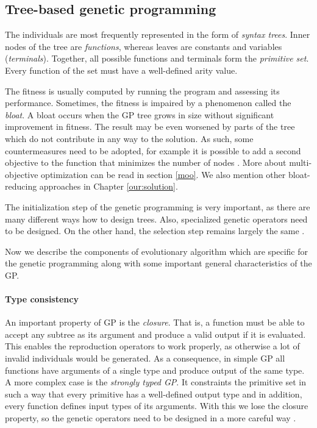 \subsection{Tree-based genetic programming} \label{gp:treebased}
The individuals are most frequently represented in the form of 
\emph{syntax trees}. Inner nodes of the tree are \emph{functions}, whereas 
leaves  are constants and variables (\emph{terminals}). Together, all possible
functions and terminals form the \emph{primitive set}. Every function of the
set must have a well-defined arity value.

The fitness is usually computed by running the program and assessing its
performance. Sometimes, the fitness is impaired by a phenomenon called the
\emph{bloat}. A bloat occurs when the GP tree grows in size without significant
improvement in fitness. The result may be even worsened by parts of the tree which
do not contribute in any way to the solution. As such, some countermeasures need
to be adopted, for example it is possible to add a second objective to the function
that minimizes the number of nodes \citep[p.~24--26]{Poli:2008:FGG:1796422}.
More about multi-objective optimization can be
read in section \ref{moo}. We also mention other bloat-reducing approaches 
in Chapter \ref{our:solution}.

The initialization step of the genetic programming is very important, as
there are many different ways how to design trees. Also, specialized genetic
operators need to be designed. On the other hand, the selection step remains
largely the same \citep{Poli:2008:FGG:1796422}.

Now we describe the components of evolutionary algorithm which are specific
for the genetic programming along with some important general characteristics
of the GP.

\paragraph{Type consistency}
An important property of GP is the \emph{closure}. That is, a function must
be able to accept any subtree as its argument and produce a valid output if
it is evaluated. This enables the reproduction operators to work properly, as
otherwise a lot of invalid individuals would be generated. As a consequence,
in simple GP all functions have arguments of a single type and produce output
of the same type. A more complex case is the \emph{strongly typed GP}. It
constraints the primitive set in such a way that every primitive has a
well-defined output type and in addition, every function defines input types of
its arguments. With this we lose the closure property, so the genetic operators
need to be designed in a more careful way \citep[p.~21]{Poli:2008:FGG:1796422}.

